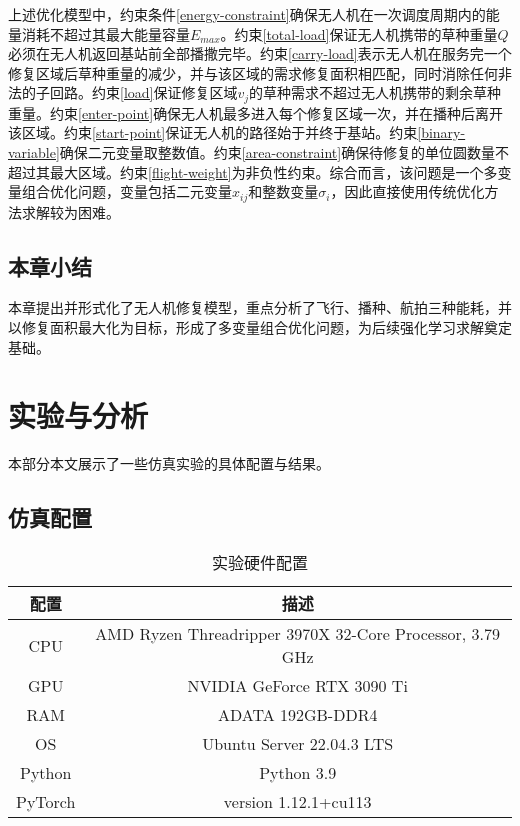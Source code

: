 \documentclass[AutoFakeBold]{LZUThesis}
\begin{document}
上述优化模型中，约束条件\eqref{energy-constraint}确保无人机在一次调度周期内的能量消耗不超过其最大能量容量$E_{max}$。约束\eqref{total-load}保证无人机携带的草种重量$Q$必须在无人机返回基站前全部播撒完毕。约束\eqref{carry-load}表示无人机在服务完一个修复区域后草种重量的减少，并与该区域的需求修复面积相匹配，同时消除任何非法的子回路。约束\eqref{load}保证修复区域$v_j$的草种需求不超过无人机携带的剩余草种重量。约束\eqref{enter-point}确保无人机最多进入每个修复区域一次，并在播种后离开该区域。约束\eqref{start-point}保证无人机的路径始于并终于基站。约束\eqref{binary-variable}确保二元变量取整数值。约束\eqref{area-constraint}确保待修复的单位圆数量不超过其最大区域。约束\eqref{flight-weight}为非负性约束。综合而言，该问题是一个多变量组合优化问题，变量包括二元变量$x_{ij}$和整数变量$\sigma_i$，因此直接使用传统优化方法求解较为困难。


\section{本章小结}
本章提出并形式化了无人机修复模型，重点分析了飞行、播种、航拍三种能耗，并以修复面积最大化为目标，形成了多变量组合优化问题，为后续强化学习求解奠定基础。



\chapter{实验与分析}
本部分本文展示了一些仿真实验的具体配置与结果。
\label{sub:实验配置表格}
\section{仿真配置}
\begin{table}[H]
	\centering
	\caption{实验硬件配置}
	\begin{tabular}{cc} %
		\toprule
		配置      & 描述                                                       \\
		\midrule
		CPU     & AMD Ryzen Threadripper 3970X 32-Core Processor, 3.79 GHz \\
		GPU     & NVIDIA GeForce RTX 3090 Ti                               \\
		RAM     & ADATA 192GB-DDR4                                         \\
		OS      & Ubuntu Server 22.04.3 LTS                                \\
		Python  & Python 3.9                                               \\
		PyTorch & version 1.12.1+cu113                                     \\
		\bottomrule
	\end{tabular}
	\label{tbl_hardware_config}
\end{table}
\end{document}

